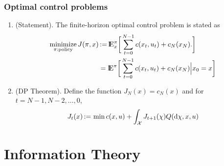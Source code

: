 \documentclass[a4paper,10pt]{article}
\begin{document}
\subsubsection{Optimal control problems}
\begin{enumerate}
 \item (Statement). The finite-horizon optimal control problem is stated as 
 \begin{align*}
  \minimize_{\pi: \text{policy}} J(\pi,x) &\dfn \E_x^\pi\bigg[
    \sum_{t=0}^{N-1}c(x_t, u_t) + c_N(x_N).
  \bigg]\\
  &=\E^\pi\bigg[
    \sum_{t=0}^{N-1}c(x_t, u_t) + c_N(x_N) {}\Big|{} x_0 = x
  \bigg]
 \end{align*}
 \item (DP Theorem). Define the function $J_N(x) = c_N(x)$ and for $t=N-1,N-2,\ldots, 0$, 
 \[
  J_t(x) {}\mathop{\mathrel{:}=}{} \min c(x,u) + \int_{\mathcal{X}}J_{t+1}(\chi)Q(\mathrm{d}\chi, x, u)
 \]

\end{enumerate}


\section{Information Theory}
\end{document}
